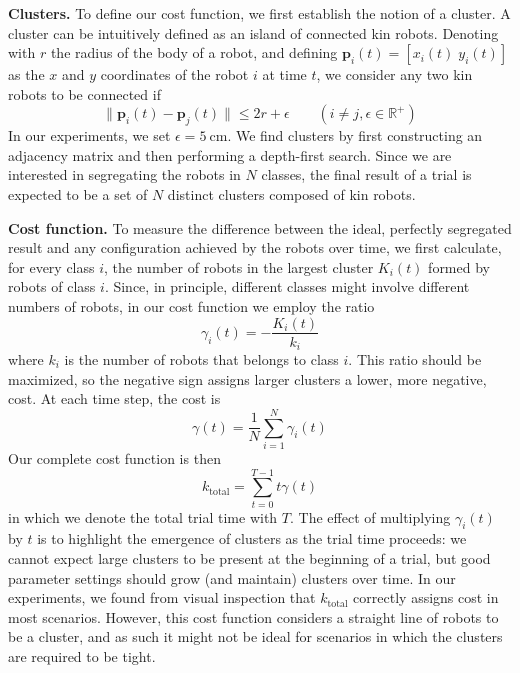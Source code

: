 \documentclass[letterpaper, 10 pt, conference]{ieeeconf}
\newcommand{\myparagraph}[1]{\textbf{#1.}}
\renewcommand{\vec}[1]{\ensuremath{\mathbf{#1}}}
\begin{document}
\myparagraph{Clusters}
To define our cost function, we first establish the notion of a cluster.  A
cluster can be intuitively defined as an island of connected kin robots.
Denoting with $r$ the radius of the body of a robot, and defining
$\vec{p}_i(t) = [x_i(t)\;y_i(t)]$ as the $x$ and $y$ coordinates of the robot
$i$ at time $t$, we consider any two kin robots to be connected if
\begin{equation} \label{eq:connected}
  \lVert\vec{p}_i(t) - \vec{p}_j(t)\rVert \le 2r + \epsilon \qquad (i \ne j, \epsilon \in \mathbb{R}^+)
\end{equation}
In our experiments, we set $\epsilon = \SI{5}{\centi\meter}$.
We find clusters by first constructing an adjacency matrix and then performing a depth-first search.
Since we are interested in segregating the robots in $N$ classes,
the final result of a trial is expected to be a set of $N$ distinct clusters composed of kin robots.

\myparagraph{Cost function}
To measure the difference between the ideal, perfectly segregated result and any
configuration achieved by the robots over time, we first calculate, for every
class $i$, the number of robots in the largest cluster $K_i(t)$ formed by robots
of class $i$. Since, in principle, different classes might involve different
numbers of robots, in our cost function we employ the ratio
$$
\gamma_i(t) = -\frac{K_i(t)}{k_i}
$$
where $k_i$ is the number of robots that belongs to class $i$. This ratio should
be maximized, so the negative sign assigns larger clusters a lower, more
negative, cost.  At each time step, the cost is
$$
\gamma(t) = \frac{1}{N}\sum_{i=1}^N\gamma_i(t)
$$
Our complete cost function is then
\begin{equation}
  \label{eq:cost_function}
  k_{\text{total}} =  \sum_{t=0}^{T-1} t\gamma(t)
\end{equation}
in which we denote the total trial time with $T$. The effect of multiplying
$\gamma_i(t)$ by $t$ is to highlight the emergence of clusters as the trial time
proceeds: we cannot expect large clusters to be present at the beginning of a
trial, but good parameter settings should grow (and maintain) clusters over
time. In our experiments, we found from visual inspection that
$k_{\text{total}}$ correctly assigns cost in most scenarios.  However, this cost
function considers a straight line of robots to be a cluster, and as such it
might not be ideal for scenarios in which the clusters are required to be tight.
\end{document}
